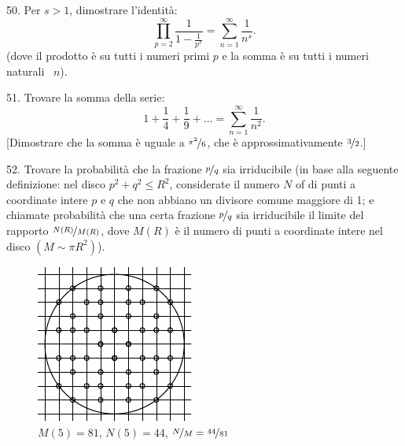 \begin{problem}{50.}
	Per $s>1$, dimostrare l’identità:
	\begin{equation*}
		\textstyle\prod\limits_{p=2}^{\infty} \frac{1}{1-\frac{1}{p^s}}=\textstyle\sum\limits_{n=1}^{\infty} \frac{1}{n^s}.
	\end{equation*}
	(dove il prodotto è su tutti i numeri primi $p$ e la somma è su tutti i numeri naturali ~$n$).
\end{problem}

\begin{problem}{51.}
	Trovare la somma della serie:
	\begin{equation*}
		1+ \frac{1}{4}+ \frac{1}{9}+\dots=\textstyle\sum\limits_{n=1}^{\infty} \frac{1}{n^2}.
	\end{equation*}
	[Dimostrare che la somma è uguale a $\nicefrac{\pi^2}{6}$, che è approssimativamente  $\nicefrac{3}{2}$.]
\end{problem}

\begin{problem}{52.}
	Trovare la probabilità che la frazione  $\nicefrac{p}{q}$ sia irriducibile (in base alla seguente definizione:
	nel disco $p^2+q^2 \leqslant R^2$, considerate il numero $N$ of di punti a coordinate intere $p$ e $q$ che non abbiano un divisore comune maggiore di 1; e chiamate probabilità che una certa frazione $\nicefrac{p}{q}$ sia irriducibile il limite del rapporto $\nicefrac{N(R)}{M(R)}$, dove $M(R)$ è il numero di punti a coordinate intere nel disco $(M \sim \pi R^2)$).
	\begin{figure}
		\includegraphics{resources/taskbook-36}\\
		\footnotesize $M(5)=81$, $N(5)=44$, $\nicefrac{N}{M} = \nicefrac{44}{81}$
	\end{figure}
\end{problem}

